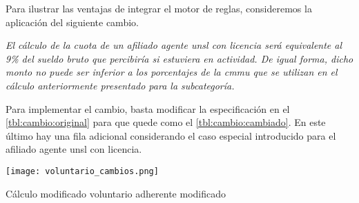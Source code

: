 Para ilustrar las ventajas de integrar el motor de reglas, consideremos la aplicación del siguiente cambio.

\emph{
El cálculo de la cuota de un afiliado agente \acrshort{unsl} con licencia será equivalente al 9\% del sueldo bruto que percibiría si estuviera en actividad. 
De igual forma, dicho monto no puede ser inferior a los porcentajes de la \acrshort{cmmu} que se utilizan en el cálculo anteriormente presentado para la subcategoría.
}

Para implementar el cambio, basta modificar la especificación en el \cref{tbl:cambio:original} para que quede como el \cref{tbl:cambio:cambiado}. 
En este último hay una fila adicional considerando el caso especial introducido para el afiliado agente \acrshort{unsl} con licencia.

\begin{table*}
    \centering
    \texttt{[image: voluntario\_cambios.png]}
    \caption{Cálculo modificado voluntario adherente modificado}
    \label{tbl:cambio:cambiado}
\end{table*}
